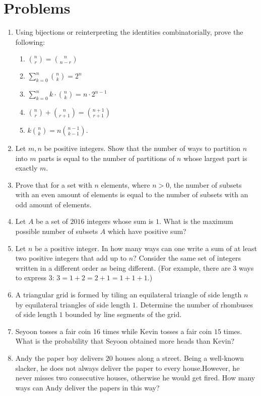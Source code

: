 \documentclass[12pt]{article}
\begin{document}
\section{Problems}

\begin{enumerate}
	\item Using bijections or reinterpreting the identities combinatorially, prove the following:
	\begin{enumerate}
		\item $\displaystyle \binom{n}{r}=\binom{n}{n-r}$
		\item $\displaystyle \sum^n_{k=0}\binom{n}{k}=2^n$
		\item $\displaystyle \sum^n_{k=0}k\cdot \binom{n}{k}=n\cdot 2^{n-1}$
		\item $\displaystyle \binom{n}{r}+\binom{n}{r+1}=\binom{n+1}{r+1}$
		\item $\displaystyle k\binom{n}{k}=n\binom{n-1}{k-1}$.
	\end{enumerate}
	\item Let $m,n$ be positive integers. Show that the number of ways to partition $n$ into $m$ parts is equal to the number of partitions of $n$ whose largest part is exactly $m$.
	\item Prove that for a set with $n$ elements, where $n>0$, the number of subsets with an even amount of elements is equal to the number of subsets with an odd amount of elements.
	\item Let $A$ be a set of $2016$ integers whose sum is $1$. What is the maximum possible number of subsets $A$ which have positive sum?
	\item Let $n$ be a positive integer. In how many ways can one write a sum of at least two positive integers that add up to $n$? Consider the same set of integers written in a different order as being different. (For example, there are $3$ ways to express $3$: $3=1+2=2+1=1+1+1$.)
	\item A triangular grid is formed by tiling an equilateral triangle of side length $n$ by equilateral triangles of side length $1$. Determine the number of rhombuses of side length $1$ bounded by line segments of the grid.
	\item Seyoon tosses a fair coin $16$ times while Kevin tosses a fair coin $15$ times. What is the probability that Seyoon obtained more heads than Kevin?
	\item Andy the paper boy delivers $20$ houses along a street. Being a well-known slacker, he does not always deliver the paper to every house.However, he never misses two consecutive houses, otherwise he would get fired. How many ways can Andy deliver the papers in this way?

\end{enumerate}
\end{document}
